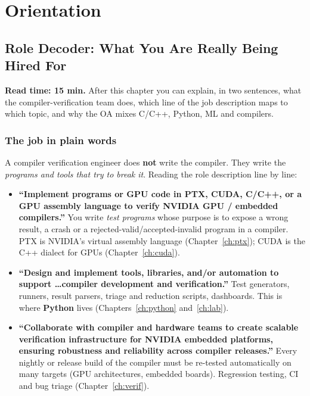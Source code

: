 \documentclass[10pt,a4paper,openany,oneside]{report}
\newcommand{\prio}[1]{\texorpdfstring{\ifcase#1\or{\color{gold}\ding{72}}\or{\color{gold}\ding{72}\ding{72}}\or{\color{gold}\ding{72}\ding{72}\ding{72}}\fi}{}}
\begin{document}
\tableofcontents
\clearpage

\part{Orientation}


\chapter{Role Decoder: What You Are Really Being Hired For}
\label{ch:role}

\begin{chapbox}
\textbf{Read time: 15 min.} After this chapter you can explain, in two sentences, what the compiler-verification team does, which line of the
job description maps to which topic, and why the OA mixes C/C++, Python, ML and compilers.
\end{chapbox}

\section{The job in plain words \prio{3}}
A compiler verification engineer does \textbf{not} write the compiler. They write the \emph{programs and tools that try to break it}.
Reading the role description line by line:

\begin{itemize}
\item \textbf{``Implement programs or GPU code in PTX, CUDA, C/C++, or a GPU assembly language to verify NVIDIA GPU / embedded compilers.''}
 You write \emph{test programs} whose purpose is to expose a wrong result, a crash or a rejected-valid/accepted-invalid program in a compiler.
 PTX is NVIDIA's virtual assembly language (Chapter~\ref{ch:ptx}); CUDA is the C++ dialect for GPUs (Chapter~\ref{ch:cuda}).
\item \textbf{``Design and implement tools, libraries, and/or automation to support \ldots compiler development and verification.''}
 Test generators, runners, result parsers, triage and reduction scripts, dashboards. This is where \textbf{Python} lives
 (Chapters~\ref{ch:python} and~\ref{ch:lab}).
\item \textbf{``Collaborate with compiler and hardware teams to create scalable verification infrastructure for NVIDIA embedded platforms, ensuring robustness and reliability across compiler releases.''}
 Every nightly or release build of the compiler must be re-tested automatically on many targets (GPU architectures, embedded boards). Regression
 testing, CI and bug triage (Chapter~\ref{ch:verif}).
\end{itemize}
\end{document}
